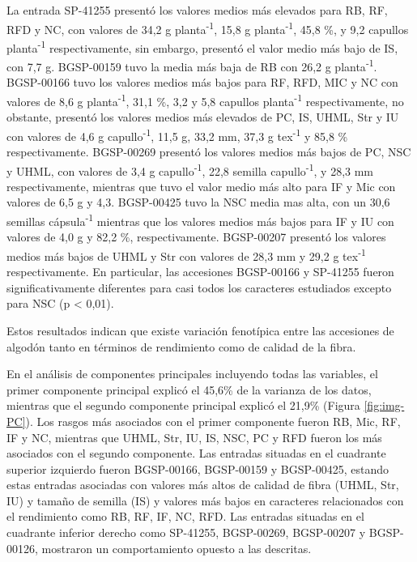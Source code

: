 \documentclass[12pt,oneside]{reedthesis}
\begin{document}
La entrada SP-41255 presentó los valores medios más elevados para RB, RF, RFD y NC, con valores de 34,2 g planta\textsuperscript{-1}, 15,8 g planta\textsuperscript{-1}, 45,8 \%, y 9,2 capullos planta\textsuperscript{-1} respectivamente, sin embargo, presentó el valor medio más bajo de IS, con 7,7 g. BGSP-00159 tuvo la media más baja de RB con 26,2 g planta\textsuperscript{-1}. BGSP-00166 tuvo los valores medios más bajos para RF, RFD, MIC y NC con valores de 8,6 g planta\textsuperscript{-1}, 31,1 \%, 3,2 y 5,8 capullos planta\textsuperscript{-1} respectivamente, no obstante, presentó los valores medios más elevados de PC, IS, UHML, Str y IU con valores de 4,6 g capullo\textsuperscript{-1}, 11,5 g, 33,2 mm, 37,3 g tex\textsuperscript{-1} y 85,8 \% respectivamente. BGSP-00269 presentó los valores medios más bajos de PC, NSC y UHML, con valores de 3,4 g capullo\textsuperscript{-1}, 22,8 semilla capullo\textsuperscript{-1}, y 28,3 mm respectivamente, mientras que tuvo el valor medio más alto para IF y Mic con valores de 6,5 g y 4,3. BGSP-00425 tuvo la NSC media mas alta, con un 30,6 semillas cápsula\textsuperscript{-1} mientras que los valores medios más bajos para IF y IU con valores de 4,0 g y 82,2 \%, respectivamente. BGSP-00207 presentó los valores medios más bajos de UHML y Str con valores de 28,3 mm y 29,2 g tex\textsuperscript{-1} respectivamente. En particular, las accesiones BGSP-00166 y SP-41255 fueron significativamente diferentes para casi todos los caracteres estudiados excepto para NSC (p \textless{} 0,01).

Estos resultados indican que existe variación fenotípica entre las accesiones de algodón tanto en términos de rendimiento como de calidad de la fibra.

En el análisis de componentes principales incluyendo todas las variables, el primer componente principal explicó el 45,6\% de la varianza de los datos, mientras que el segundo componente principal explicó el 21,9\% (Figura \ref{fig:img-PC}). Los rasgos más asociados con el primer componente fueron RB, Mic, RF, IF y NC, mientras que UHML, Str, IU, IS, NSC, PC y RFD fueron los más asociados con el segundo componente. Las entradas situadas en el cuadrante superior izquierdo fueron BGSP-00166, BGSP-00159 y BGSP-00425, estando estas entradas asociadas con valores más altos de calidad de fibra (UHML, Str, IU) y tamaño de semilla (IS) y valores más bajos en caracteres relacionados con el rendimiento como RB, RF, IF, NC, RFD. Las entradas situadas en el cuadrante inferior derecho como SP-41255, BGSP-00269, BGSP-00207 y BGSP-00126, mostraron un comportamiento opuesto a las descritas.
\end{document}
